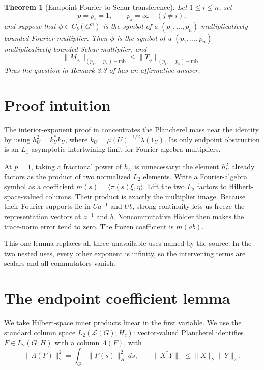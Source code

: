 \documentclass[11pt]{article}
\newtheorem{theorem}{Theorem}
\newcommand{\LG}{\mathcal L(G)}
\newcommand{\mb}{\mathrm{mb}}
\begin{document}
\begin{theorem}[Endpoint Fourier-to-Schur transference]\label{thm:main}
Let \(1\le i\le n\), set
\[
 p=p_i=1,\qquad p_j=\infty\quad(j\ne i),
\]
and suppose that \(\phi\in C_b(G^n)\) is the symbol of a
\((p_1,\ldots,p_n)\)-multiplicatively bounded Fourier multiplier.  Then
\(\widetilde\phi\) is the symbol of a
\((p_1,\ldots,p_n)\)-multiplicatively bounded Schur multiplier, and
\[
 \|M_{\widetilde\phi}\|_{(p_1,\ldots,p_n)-\mb}
 \le
 \|T_\phi\|_{(p_1,\ldots,p_n)-\mb}.
\]
Thus the question in Remark 3.3 of \cite{CKV} has an affirmative answer.
\end{theorem}

\section{Proof intuition}

The interior-exponent proof in \cite{CKV} concentrates the Plancherel mass
near the identity by using
\(h_U^2=k_U^*k_U\), where
\(k_U=\mu(U)^{-1/2}\lambda(1_U)\).  Its only endpoint obstruction is an
\(L_1\) asymptotic-intertwining limit for Fourier-algebra multipliers.

At \(p=1\), taking a fractional power of \(h_U\) is unnecessary: the element
\(h_U^2\) already factors as the product of two normalized \(L_2\) elements.
Write a Fourier-algebra symbol as a coefficient
\(m(s)=\langle\pi(s)\xi,\eta\rangle\).  Lift the two \(L_2\) factors to
Hilbert-space-valued columns.  Their product is exactly the multiplier image.
Because their Fourier supports lie in \(Ua^{-1}\) and \(Ub\), strong
continuity lets us freeze the representation vectors at \(a^{-1}\) and
\(b\).  Noncommutative H\"older then makes the trace-norm error tend to zero.
The frozen coefficient is \(m(ab)\).

This one lemma replaces all three unavailable uses named by the source.  In
the two nested uses, every other exponent is infinity, so the intervening
terms are scalars and all commutators vanish.

\section{The endpoint coefficient lemma}

We take Hilbert-space inner products linear in the first variable.  We use the
standard column space \(L_2(\LG;H_c)\): vector-valued Plancherel identifies
\(F\in L_2(G;H)\) with a column \(\Lambda(F)\), with
\[
 \|\Lambda(F)\|_2^2=\int_G\|F(s)\|_H^2\,ds,
 \qquad
 \|X^*Y\|_1\le \|X\|_2\|Y\|_2.                 \tag{4.1}
\]
\end{document}
